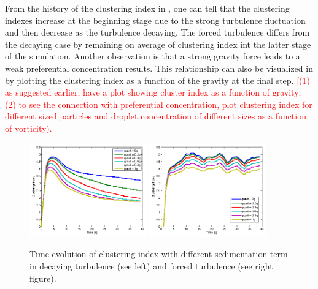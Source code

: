 \documentclass[draft,jgrga]{AGUTeX}
\begin{document}
\begin{article}
From the history of the clustering index in , one can tell that the clustering indexes increase at the beginning stage due to the strong turbulence fluctuation and then decrease as the turbulence decaying. The forced turbulence differs from the decaying case by remaining on average of clustering index int the latter stage of the simulation. Another observation is that a strong gravity force leads to a weak preferential concentration results. This relationship can also be visualized in  by plotting the clustering index as a function of the gravity at the final step. 
\textcolor{red}{
[(1) as suggested earlier, have a plot showing cluster index as a function of gravity; (2) to see the connection with preferential concentration, plot clustering index for different sized particles and droplet concentration of different sizes as a function of vorticity).
}
\begin{figure}[H]\centering
\includegraphics[width=0.45\textwidth]{Figures/gravity_time_decay}
\includegraphics[width=0.45\textwidth]{Figures/gravity_time_force}
\caption{Time evolution of clustering index with different sedimentation term in decaying turbulence (see left) and 
forced turbulence (see right figure).}
\label{fig:gravity_cluster}
\end{figure}


\end{article}
\end{document}
